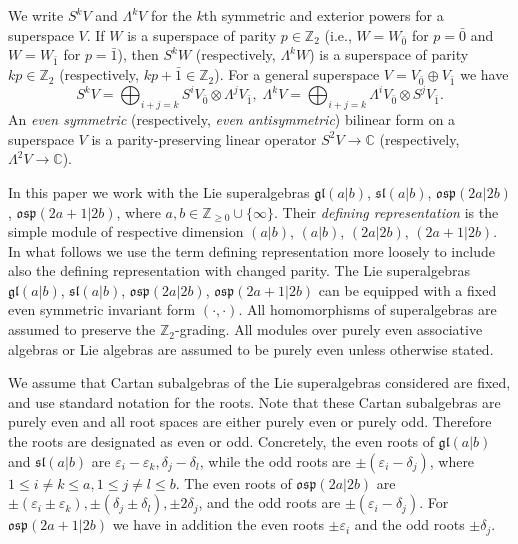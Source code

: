 \documentclass[12pt]{amsart}
\theoremstyle{plain} %
\numberwithin{equation}{section}
\theoremstyle{definition}
\theoremstyle{remark}
\theoremstyle{plain} %
\renewcommand{\sl}{\mathfrak{sl}}
\newcommand{\osp}{\mathfrak{osp}}
\newcommand{\C}{\mathbb{C}}
\begin{document}
We write $S^k V$  and  $\Lambda^k V$  for the $k$th  symmetric and exterior powers for a superspace $V$. If $W$ is a superspace of parity $p \in \mathbb Z_2 $ (i.e., $W = W_{\bar{0}}$ for $p=\bar{0}$ and $W = W_{\bar{1}}$ for $p=\bar{1}$), then $S^k W$  (respectively, $\Lambda^k W$) is a superspace of parity $kp \in \mathbb Z_2 $ (respectively, $kp + \bar{1} \in \mathbb Z_2 $). For a general superspace $V = V_{\bar{0}} \oplus V_{\bar{1}}$ we have
      $$
   S^kV = \bigoplus_{i+j = k} {S}^{i}V_{\bar{0}} \otimes \Lambda^{j} V_{\bar{1}}, \;   \Lambda^kV = \bigoplus_{i+j = k} \Lambda^{i}V_{\bar{0}} \otimes S^{j} V_{\bar{1}}.
   $$
  An \emph{ even  symmetric} (respectively, \emph{even antisymmetric}) bilinear form on a superspace $V$ is a parity-preserving linear operator $S^2V \to \C$ (respectively, $\Lambda^2V \to \C$).
  
  
  In this paper we work with the Lie superalgebras $\mathfrak{gl}(a|b)$, $\sl (a|b)$, $\osp (2a|2b)$, $\osp (2a+1|2b)$, where $a, b \in \mathbb Z_{\geq 0} \cup \{ \infty\}$. Their  \emph{defining representation} is the  simple module of respective dimension $(a|b)$,  $(a|b)$, $(2a|2b)$, $(2a+1|2b)$. In what follows we use the term defining representation more loosely to include also the defining representation with changed parity. The Lie superalgebras $\mathfrak{gl}(a|b)$, $\sl (a|b)$, $\osp (2a|2b)$, $\osp (2a+1|2b)$ can be equipped with a fixed even symmetric invariant form  $(\cdot, \cdot)$. All homomorphisms of superalgebras are assumed to preserve the $\mathbb Z_2$-grading.  All modules over purely even  associative algebras or Lie algebras are assumed to be purely even unless otherwise stated.
  
  
  We assume that  Cartan subalgebras of the Lie superalgebras considered are fixed, and use standard notation for the roots.  Note that these Cartan subalgebras are purely even and all root spaces are either purely even or purely odd. Therefore the roots are designated as even or odd.    Concretely, the even roots of  $\mathfrak{gl}(a|b)$ and  $\sl (a|b)$ are 
$\varepsilon_i - \varepsilon_{k}, \delta_j - \delta_l$, while the odd roots are $\pm (\varepsilon_i - \delta_j)$, where $1\leq i \neq k \leq a, 1 \leq j \neq l \leq b 
$. The even roots of $\mathfrak{osp}(2a|2b)$ are $\pm ( \varepsilon_i \pm  \varepsilon_{k}), \pm (\delta_j \pm  \delta_l), \pm 2 \delta_j$, and the odd roots are $\pm (\varepsilon_i - \delta_j)$. For $\mathfrak{osp}(2a+1|2b)$ we have in addition the even roots $ \pm  \varepsilon_i $ and the odd roots  $\pm \delta_j$. 
\end{document}

